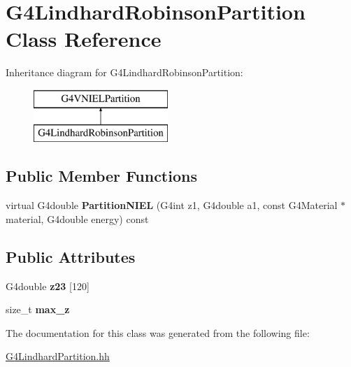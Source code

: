 \hypertarget{classG4LindhardRobinsonPartition}{\section{G4\-Lindhard\-Robinson\-Partition Class Reference}
\label{classG4LindhardRobinsonPartition}
}
Inheritance diagram for G4\-Lindhard\-Robinson\-Partition\-:\begin{figure}[H]
\begin{center}
\leavevmode
\includegraphics[height=2.000000cm]{classG4LindhardRobinsonPartition}
\end{center}
\end{figure}
\subsection*{Public Member Functions}
\begin{DoxyCompactItemize}
\item 
\hypertarget{classG4LindhardRobinsonPartition_ac30d5638ca4955af0b8fe09c6646b7e0}{virtual G4double {\bfseries Partition\-N\-I\-E\-L} (G4int z1, G4double a1, const G4\-Material $\ast$material, G4double energy) const }\label{classG4LindhardRobinsonPartition_ac30d5638ca4955af0b8fe09c6646b7e0}

\end{DoxyCompactItemize}
\subsection*{Public Attributes}
\begin{DoxyCompactItemize}
\item 
\hypertarget{classG4LindhardRobinsonPartition_a8e695188dd4b287ec6d4d03c004479b2}{G4double {\bfseries z23} \mbox{[}120\mbox{]}}\label{classG4LindhardRobinsonPartition_a8e695188dd4b287ec6d4d03c004479b2}

\item 
\hypertarget{classG4LindhardRobinsonPartition_a1a9008d3cf7dc340f9d1f8e80ad501ef}{size\-\_\-t {\bfseries max\-\_\-z}}\label{classG4LindhardRobinsonPartition_a1a9008d3cf7dc340f9d1f8e80ad501ef}

\end{DoxyCompactItemize}


The documentation for this class was generated from the following file\-:\begin{DoxyCompactItemize}
\item 
\hyperlink{G4LindhardPartition_8hh}{G4\-Lindhard\-Partition.\-hh}\end{DoxyCompactItemize}
